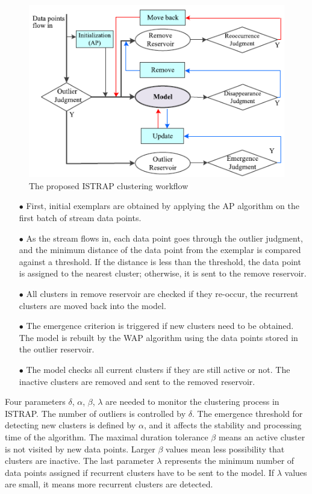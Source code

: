 \begin{figure}[]
\centering
\includegraphics[width =10 cm]{image/Chapters/Chapter3/istrap1.PNG}
\caption{The proposed ISTRAP clustering workflow}
\label{istrap}
\end{figure}

\begin{itemize}
    \item[$\bullet$] First, initial exemplars are obtained by applying the AP algorithm on the first batch of stream data points.
    \item[$\bullet$] As the stream flows in, each data point goes through the outlier judgment, and the minimum distance of the data point from the exemplar is compared against a threshold. If the distance is less than the threshold, the data point is assigned to the nearest cluster; otherwise, it is sent to the remove reservoir.
    \item[$\bullet$] All clusters in remove reservoir are checked if they re-occur, the recurrent clusters are moved back into the model.
    \item[$\bullet$] The emergence criterion is triggered if new clusters need to be obtained. The model is rebuilt by the WAP algorithm using the data points stored in the outlier reservoir.
    \item[$\bullet$] The model checks all current clusters if they are still active or not. The inactive clusters are removed and sent to the removed reservoir.
\end{itemize}

Four parameters $\delta$, $\alpha$, $\beta$, $\lambda$  are needed to monitor the clustering process in ISTRAP. The number of outliers is controlled by $\delta$. The emergence threshold for detecting new clusters is defined by $\alpha$, and it affects the stability and processing time of the algorithm. The maximal duration tolerance $\beta$ means an active cluster is not visited by new data points. Larger $\beta$ values mean less possibility that clusters are inactive. The last parameter $\lambda$ represents the minimum number of data points assigned if recurrent clusters have to be sent to the model. If $\lambda$ values are small, it means more recurrent clusters are detected. 

